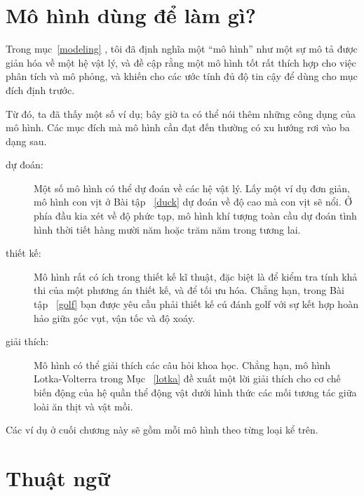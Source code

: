 \documentclass[12pt]{book}
\begin{document}
\section{Mô hình dùng để làm gì?}

Trong mục~\ref{modeling} , tôi đã định nghĩa một ``mô hình'' như một
sự mô tả được giản hóa về một hệ vật lý, và đề cập rằng một mô hình
tốt rất thích hợp cho việc phân tích và mô phỏng, và khiến cho các 
ước tính đủ độ tin cậy để dùng cho mục đích định trước.

Từ đó, ta đã thấy một số ví dụ; bây giờ ta có thể nói thêm những công
dụng của mô hình. Các mục đích mà mô hình cần đạt đến thường có
xu hướng rơi vào ba dạng sau.
 
\begin{description}

\item[dự đoán:] Một số mô hình có thể dự đoán về các hệ vật lý. Lấy
một ví dụ đơn giản, mô hình con vịt ở Bài tập~ \ref{duck} dự đoán về
độ cao mà con vịt sẽ nổi. Ở phía đầu kia xét về độ phức tạp, mô hình
khí tượng toàn cầu dự đoán tình hình thời tiết hàng mười năm hoặc
trăm năm trong tương lai.

\item[thiết kế:] Mô hình rất có ích trong thiết kế kĩ thuật, đặc biệt
là để kiểm tra tính khả thi của một phương án thiết kế, và để 
tối ưu hóa. Chẳng hạn, trong Bài tập~ \ref{golf} bạn được yêu cầu
phải thiết kế cú đánh golf với sự kết hợp hoàn hảo giữa góc vụt,
vận tốc và độ xoáy.

\item[giải thích:] Mô hình có thể giải thích các câu hỏi khoa học.
Chẳng hạn, mô hình Lotka-Volterra trong Mục~ \ref{lotka} đề xuất
một lời giải thích cho cơ chế biến động của hệ quần thể động vật
dưới hình thức các mối tương tác giữa loài ăn thịt và vật mồi.

\end{description}

Các ví dụ ở cuối chương này sẽ gồm mỗi mô hình theo từng loại
kể trên.


\section{Thuật ngữ}
\end{document}
